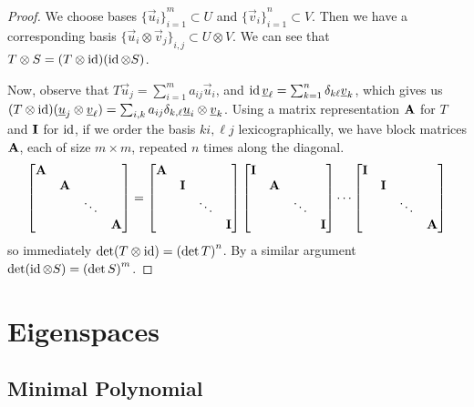 \begin{proof}
    We choose bases \({\{\vec{u}_i\}}_{i=1}^m \subset U\)
    and \({\{\vec{v}_i\}}_{i=1}^n \subset V\).
    Then we have a corresponding basis \({\{\vec{u}_i\otimes\vec{v}_j\}}_{i,j} \subset U \otimes V\).
    We can see that \(T \otimes S = (T \otimes \operatorname{id})(\operatorname{id} \otimes S)\).

    Now, observe that \(T\vec{u}_j = \sum_{i=1}^m a_{ij}\vec{u}_i\),
    and \(\operatorname{id}\underline{v}_\ell = \sum_{k=1}^n \delta_{k\ell}\underline{v}_k\),
    which gives us \((T \otimes \operatorname{id})(\underline{u}_j\otimes\underline{v}_\ell)
    = \sum_{i,k} a_{ij}\delta_{k,\ell} \underline{u}_i\otimes\underline{v}_k\).
    Using a matrix representation \(\vb{A}\) for \(T\) and \(\vb{I}\) for \(\operatorname{id}\),
    if we order the basis \(ki, \ell j\) lexicographically,
    we have block matrices \(\vb{A}\), each of size \(m \times m\), repeated \(n\) times along the diagonal.
    \begin{equation*}
        \bmqty{\vb{A} \\ & \vb{A} \\ && \ddots \\ &&& \vb{A}}
        = \bmqty{\vb{A} \\ & \vb{I} \\ && \ddots \\ &&& \vb{I}}
        \bmqty{\vb{I} \\ & \vb{A} \\ && \ddots \\ &&& \vb{I}} \cdots
        \bmqty{\vb{I} \\ & \vb{I} \\ && \ddots \\ &&& \vb{A}}
    \end{equation*}
    so immediately \(\det(T \otimes \id) = \pqty{\det T}^n\).
    By a similar argument \(\det(\id \otimes S) = \pqty{\det S}^m\).
\end{proof}


\section{Eigenspaces}

\subsection*{Minimal Polynomial}

